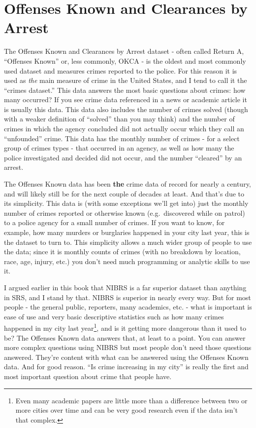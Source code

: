 \documentclass[
  12pt,
  openany]{book}
\begin{document}
\chapter{Offenses Known and Clearances by Arrest}\label{offensesKnown}

The Offenses Known and Clearances by Arrest dataset - often called Return A, ``Offenses Known'' or, less commonly, OKCA - is the oldest and most commonly used dataset and measures crimes reported to the police. For this reason it is used as \emph{the} main measure of crime in the United States, and I tend to call it the ``crimes dataset.'' This data answers the most basic questions about crimes: how many occurred? If you see crime data referenced in a news or academic article it is usually this data. This data also includes the number of crimes solved (though with a weaker definition of ``solved'' than you may think) and the number of crimes in which the agency concluded did not actually occur which they call an ``unfounded'' crime. This data has the monthly number of crimes - for a select group of crimes types - that occurred in an agency, as well as how many the police investigated and decided did not occur, and the number ``cleared'' by an arrest.

The Offenses Known data has been \textbf{the} crime data of record for nearly a century, and will likely still be for the next couple of decades at least. And that's due to its simplicity. This data is (with some exceptions we'll get into) just the monthly number of crimes reported or otherwise known (e.g.~discovered while on patrol) to a police agency for a small number of crimes. If you want to know, for example, how many murders or burglaries happened in your city last year, this is the dataset to turn to. This simplicity allows a much wider group of people to use the data; since it is monthly counts of crimes (with no breakdown by location, race, age, injury, etc.) you don't need much programming or analytic skills to use it.

I argued earlier in this book that NIBRS is a far superior dataset than anything in SRS, and I stand by that. NIBRS is superior in nearly every way. But for most people - the general public, reporters, many academics, etc. - what is important is ease of use and very basic descriptive statistics such as how many crimes happened in my city last year\footnote{Even many academic papers are little more than a difference between two or more cities over time and can be very good research even if the data isn't that complex.}, and is it getting more dangerous than it used to be? The Offenses Known data answers that, at least to a point. You can answer more complex questions using NIBRS but most people don't need those questions answered. They're content with what can be answered using the Offenses Known data. And for good reason. ``Is crime increasing in my city'' is really the first and most important question about crime that people have.
\end{document}

